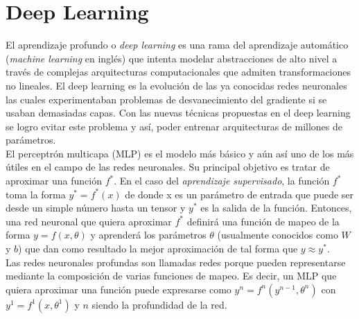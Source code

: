         
        
            


\newpage
\section{Deep Learning}
	
El aprendizaje profundo o \textit{deep learning} es una rama del aprendizaje automático (\textit{machine learning} en inglés) que intenta modelar abstracciones de alto nivel a través de complejas arquitecturas computacionales que admiten transformaciones no lineales. El deep learning es la evolución de las ya conocidas redes neuronales las cuales experimentaban problemas de desvanecimiento del gradiente si se usaban demasiadas capas. Con las nuevas técnicas propuestas en el deep learning se logro evitar este problema y así, poder entrenar arquitecturas de millones de parámetros. \\

El perceptrón multicapa (MLP) es el modelo más básico y aún así uno de los más útiles en el campo de las redes neuronales. Su principal objetivo es tratar de aproximar una función $f^{*}$. En el caso del \textit{aprendizaje supervisado}, la función $f^{*}$ toma la forma $y^{*} = f^{*}(x)$ de donde x es un parámetro de entrada que puede ser desde un simple número hasta un tensor y $y^{*}$ es la salida de la función. Entonces, una red neuronal que quiera aproximar $f^{*}$ definirá una función de mapeo de la forma $y = f(x,\theta)$ y aprenderá los parámetros $\theta$ (usualmente conocidos como $W$ y $b$) que dan como resultado la mejor aproximación de tal forma que $y \approx y^{*}$. \\

Las redes neuronales profundas son llamadas redes porque pueden representarse mediante la composición de varias funciones de mapeo. Es decir, un MLP que quiera aproximar una función puede expresarse como $y^{n} = f^{n}(y^{n-1}, \theta^{n})$ con $y^{1} = f^{1}(x, \theta^{1})$ y $n$ siendo la profundidad de la red.

